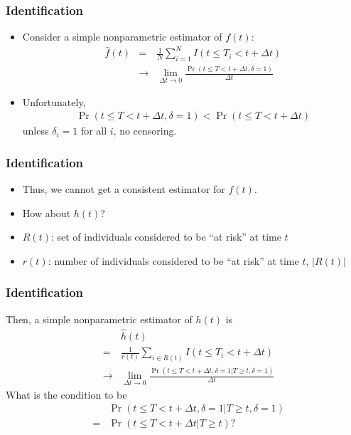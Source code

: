 \documentclass[aspectratio=169, 12pt]{beamer}
\begin{document}
	\begin{frame}
	\frametitle{Identification}
	\begin{itemize}
	\item Consider a simple nonparametric estimator of $f(t)$:
	\begin{eqnarray*}
	\hat{f}(t) &=& \frac{1}{N} \sum_{i=1}^N I(t \leq T_i < t + \Delta t)\\
	&\to& \lim_{\Delta t \to 0}\frac{\Pr(t \leq T < t + \Delta t, \delta = 1)}{\Delta t}
	\end{eqnarray*}
	\item Unfortunately,
	\begin{eqnarray*}
	\Pr(t \leq T < t + \Delta t, \delta = 1) < \Pr(t \leq T < t + \Delta t)
	\end{eqnarray*}
	unless $\delta_i = 1$ for all $i$, no censoring.

	\end{itemize}
	\end{frame}

	\begin{frame}
	\frametitle{Identification}
	\begin{itemize}
	\item Thus, we cannot get a consistent estimator for $f(t)$.
	\item How about $h(t)$?
	\item $R(t)$: set of individuals considered to be ``at risk'' at time $t$
	\item $r(t)$: number of individuals considered to be ``at risk'' at time $t$, $|R(t)|$

	\end{itemize}
	\end{frame}

	\begin{frame}
	\frametitle{Identification}
	Then, a simple nonparametric estimator of $h(t)$ is
	\begin{eqnarray*}
	&\phantom{=}& \hat{h}(t)\\
	&=& \frac{1}{r(t)} \sum_{i \in R(t)} I(t \leq T_i < t + \Delta t)\\
	&\to& \lim_{\Delta t \to 0}\frac{\Pr(t \leq T < t + \Delta t, \delta = 1 | T \geq t, \delta = 1)}{\Delta t}
	\end{eqnarray*}
	What is the condition to be
	\begin{eqnarray*}
	&\phantom{=}& \Pr(t \leq T < t + \Delta t, \delta = 1 | T \geq t, \delta = 1)\\
	&=& \Pr(t \leq T < t + \Delta t | T \geq t)?
	\end{eqnarray*}

	\end{frame}
\end{document}

